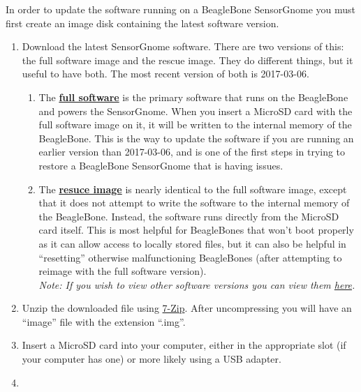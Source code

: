 \documentclass[
]{book}
\begin{document}
In order to update the software running on a BeagleBone SensorGnome you must first create an image disk containing the latest software version.

\begin{enumerate}
\def\labelenumi{\arabic{enumi}.}
\item
  Download the latest SensorGnome software. There are two versions of this: the full software image and the rescue image. They do different things, but it useful to have both. The most recent version of both is 2017-03-06.

  \begin{enumerate}
  \def\labelenumii{\roman{enumii})}
  \item
    The \href{https://public.sensorgnome.org/Beaglebone_Sensorgnome_Images/sensorgnome_image_2017-03-06_15-33-00.img.7z}{\textbf{full software}} is the primary software that runs on the BeagleBone and powers the SensorGnome. When you insert a MicroSD card with the full software image on it, it will be written to the internal memory of the BeagleBone. This is the way to update the software if you are running an earlier version than 2017-03-06, and is one of the first steps in trying to restore a BeagleBone SensorGnome that is having issues.
  \item
    The \href{https://public.sensorgnome.org/Beaglebone_Sensorgnome_Images/sensorgnome_rescue_image_2017-03-06_15-33-00.img.7z}{\textbf{resuce image}} is nearly identical to the full software image, except that it does not attempt to write the software to the internal memory of the BeagleBone. Instead, the software runs directly from the MicroSD card itself. This is most helpful for BeagleBones that won't boot properly as it can allow access to locally stored files, but it can also be helpful in ``resetting'' otherwise malfunctioning BeagleBones (after attempting to reimage with the full software version).\\
    \emph{Note: If you wish to view other software versions you can view them \href{https://public.sensorgnome.org/Beaglebone_Sensorgnome_Images/}{here}.}
  \end{enumerate}
\item
  Unzip the downloaded file using \href{https://www.7-zip.org/}{7-Zip}. After uncompressing you will have an ``image'' file with the extension ``.img''.
\item
  Insert a MicroSD card into your computer, either in the appropriate slot (if your computer has one) or more likely using a USB adapter.
\item

\end{enumerate}
\end{document}
